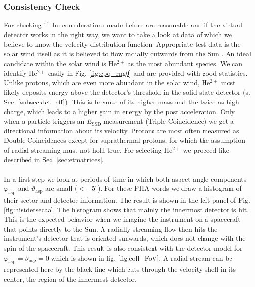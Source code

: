 \subsubsection{Consistency Check}
\label{sec:consis}
For checking if the considerations made before are reasonable and if the virtual detector works in the right way, we want to take a look at data of which we believe to know the velocity distribution function. Appropriate test data is the solar wind itself as it is believed to flow radially outwards from the Sun \citep[][,Ch. 6.1]{prlss_2004}. An ideal candidate within the solar wind is $\mathrm{He^{2+}}$ as the most abundant species. We can identify $\mathrm{He^{2+}}$ easily in Fig. \ref{fig:epq_rng0} and are provided with good statistics. Unlike protons, which are even more abundant in the solar wind, $\mathrm{He^{2+}}$ most likely deposits energy above the detector's threshold in the solid-state detector (s. Sec. \ref{subsec:det_eff}). This is because of its higher mass and the twice as high charge, which leads to a higher gain in energy by the post acceleration. Only when a particle triggers an $E_{\mathrm{SSD}}$ measurement (Triple Coincidence) we get a directional information about its velocity. Protons are most often measured as Double Coincidences except for suprathermal protons, for which the assumption of radial streaming must not hold true. For selecting $\mathrm{He^{2+}}$ we proceed like described in Sec. \ref{sec:etmatrices}.
\\ \\
In a first step we look at periods of time in which both aspect angle components $\varphi_{\mathrm{asp}}$ and $\vartheta_{\mathrm{asp}}$ are small ($<\pm5^\circ$). For these PHA words we draw a histogram of their sector and detector information. The result is shown in the left panel of Fig. \ref{fig:histdetsecaa}. The histogram shows that mainly the innermost detector is hit. This is the expected behavior when we imagine the instrument on a spacecraft that points directly to the Sun. A radially streaming flow then hits the instrument's detector that is oriented sunwards, which does not change with the spin of the spacecraft. This result is also consistent with the detector model for $\varphi_{\mathrm{asp}} = \vartheta_{\mathrm{asp}} = 0$ which is shown in fig. \ref{fig:coll_FoV}. A radial stream can be represented here by the black line which cuts through the velocity shell in its center, the region of the innermost detector.
\\
